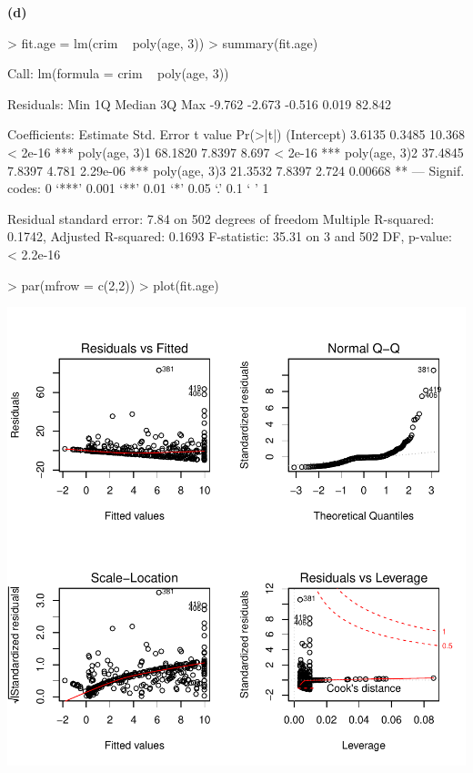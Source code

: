 \documentclass[a4paper]{article}
\renewcommand{\part}[1] {\vspace{.10in} {\bf (#1)}}
\begin{document}
\part{d}
\begin{Schunk}
\begin{Sinput}
> fit.age = lm(crim ~ poly(age, 3))
> summary(fit.age)
\end{Sinput}
\begin{Soutput}
Call:
lm(formula = crim ~ poly(age, 3))

Residuals:
   Min     1Q Median     3Q    Max 
-9.762 -2.673 -0.516  0.019 82.842 

Coefficients:
              Estimate Std. Error t value Pr(>|t|)    
(Intercept)     3.6135     0.3485  10.368  < 2e-16 ***
poly(age, 3)1  68.1820     7.8397   8.697  < 2e-16 ***
poly(age, 3)2  37.4845     7.8397   4.781 2.29e-06 ***
poly(age, 3)3  21.3532     7.8397   2.724  0.00668 ** 
---
Signif. codes:  0 ‘***’ 0.001 ‘**’ 0.01 ‘*’ 0.05 ‘.’ 0.1 ‘ ’ 1

Residual standard error: 7.84 on 502 degrees of freedom
Multiple R-squared:  0.1742,	Adjusted R-squared:  0.1693 
F-statistic: 35.31 on 3 and 502 DF,  p-value: < 2.2e-16
\end{Soutput}
\begin{Sinput}
> par(mfrow = c(2,2))
> plot(fit.age)
\end{Sinput}
\end{Schunk}
\includegraphics{mutivariblelm-age2}
\end{document}
